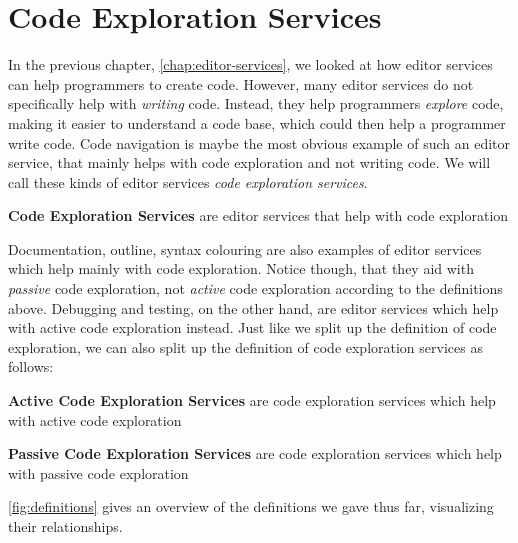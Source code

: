 \section{Code Exploration Services}\label{sec:code-exploration-services}

In the previous chapter, \cref{chap:editor-services}, we looked at how editor services can help programmers to create code.
However, many editor services do not specifically help with \emph{writing} code.
Instead, they help programmers \emph{explore} code, making it easier to understand a code base, which could then help a programmer write code.
Code navigation is maybe the most obvious example of such an editor service, that mainly helps with code exploration and not writing code.
We will call these kinds of editor services \emph{code exploration services}.

\begin{definition}
    \textbf{Code Exploration Services} are editor services that help with code exploration
\end{definition}

Documentation, outline, syntax colouring are also examples of editor services which help mainly with code exploration.
Notice though, that they aid with \emph{passive} code exploration, not \emph{active} code exploration according to the definitions above.
Debugging and testing, on the other hand, are editor services which help with active code exploration instead.
Just like we split up the definition of code exploration, we can also split up the definition of code exploration services as follows:

\begin{definition}
    \textbf{Active Code Exploration Services} are code exploration services which help with active code exploration
\end{definition}
\begin{definition}
    \textbf{Passive Code Exploration Services} are code exploration services which help with passive code exploration
\end{definition}

\cref{fig:definitions} gives an overview of the definitions we gave thus far, visualizing their relationships.

